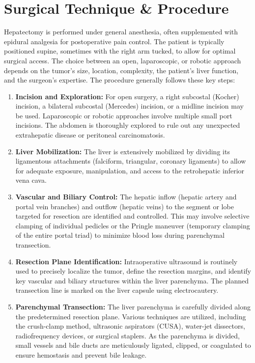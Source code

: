 \section*{Surgical Technique \& Procedure}
Hepatectomy is performed under general anesthesia, often supplemented with epidural analgesia for postoperative pain control. The patient is typically positioned supine, sometimes with the right arm tucked, to allow for optimal surgical access. The choice between an open, laparoscopic, or robotic approach depends on the tumor's size, location, complexity, the patient's liver function, and the surgeon's expertise. The procedure generally follows these key steps:

\begin{enumerate}
  \item \textbf{Incision and Exploration:} For open surgery, a right subcostal (Kocher) incision, a bilateral subcostal (Mercedes) incision, or a midline incision may be used. Laparoscopic or robotic approaches involve multiple small port incisions. The abdomen is thoroughly explored to rule out any unexpected extrahepatic disease or peritoneal carcinomatosis.
  \item \textbf{Liver Mobilization:} The liver is extensively mobilized by dividing its ligamentous attachments (falciform, triangular, coronary ligaments) to allow for adequate exposure, manipulation, and access to the retrohepatic inferior vena cava.
  \item \textbf{Vascular and Biliary Control:} The hepatic inflow (hepatic artery and portal vein branches) and outflow (hepatic veins) to the segment or lobe targeted for resection are identified and controlled. This may involve selective clamping of individual pedicles or the Pringle maneuver (temporary clamping of the entire portal triad) to minimize blood loss during parenchymal transection.
  \item \textbf{Resection Plane Identification:} Intraoperative ultrasound is routinely used to precisely localize the tumor, define the resection margins, and identify key vascular and biliary structures within the liver parenchyma. The planned transection line is marked on the liver capsule using electrocautery.
  \item \textbf{Parenchymal Transection:} The liver parenchyma is carefully divided along the predetermined resection plane. Various techniques are utilized, including the crush-clamp method, ultrasonic aspirators (CUSA), water-jet dissectors, radiofrequency devices, or surgical staplers. As the parenchyma is divided, small vessels and bile ducts are meticulously ligated, clipped, or coagulated to ensure hemostasis and prevent bile leakage.

\end{enumerate}
